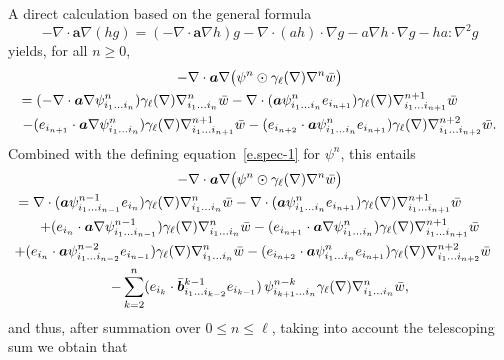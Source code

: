 \documentclass[JEP,XML,SOM,Unicode,published]{cedram}
\theoremstyle{plain}
\theoremstyle{definition}
\numberwithin{equation}{section}
\newcommand{\ee}{e}
\newcommand{\Aa}{\boldsymbol a}
\newcommand{\bb}{{\boldsymbol b}}
\begin{document}
A direct calculation {based on the general formula\vspace*{-3pt}
\[
-\nabla\cdot \Aa\nabla(hg)=(-\nabla\cdot\Aa\nabla h)g-\nabla\cdot(ah)\cdot\nabla g-a\nabla h\cdot\nabla g-ha:\nabla^2g
\]
yields, for all $n\ge0$,\vspace*{-3pt}
\begin{multline*}
-\nabla \cdot \Aa \nabla \big( \psi^n \odot \gamma_\ell(\nabla) \nabla^n \bar w\big)
\\
\hspace*{-1cm}= (-\nabla \cdot \Aa \nabla \psi^n_{i_1\ldots i_n}) \gamma_\ell(\nabla) \nabla^n_{i_1\ldots i_n} \bar w
-\nabla \cdot (\Aa \psi^n_{i_1\ldots i_n} e_{i_{n+1}}) \gamma_\ell(\nabla) \nabla^{n+1}_{i_1\ldots i_{n+1}} \bar w
\\
-(\ee_{i_{n+1}}\cdot\Aa \nabla \psi^n_{i_1\ldots i_n}) \gamma_\ell(\nabla) \nabla^{n+1}_{i_1\ldots i_{n+1}} \bar w- (\ee_{i_{n+2}}\cdot\Aa \psi^n_{i_1\ldots i_n} e_{i_{n+1}})\gamma_\ell(\nabla) \nabla^{n+2}_{i_1\ldots i_{n+2}} \bar w.
\end{multline*}
Combined with the defining equation~\eqref{e.spec-1} for $\psi^n$, this entails\vspace*{-3pt}
\begin{multline*}
-\nabla \cdot \Aa \nabla \big( \psi^n \odot \gamma_\ell(\nabla) \nabla^n \bar w\big)
\\
\hspace*{-1cm}= \nabla\cdot(\Aa\psi^{n-1}_{i_1\ldots i_{n-1}}\ee_{i_n}) \gamma_\ell(\nabla) \nabla^n_{i_1\ldots i_n} \bar w
-\nabla \cdot (\Aa \psi^n_{i_1\ldots i_n} e_{i_{n+1}}) \gamma_\ell(\nabla) \nabla^{n+1}_{i_1\ldots i_{n+1}} \bar w\\
+(\ee_{i_n}\cdot\Aa\nabla\psi^{n-1}_{i_1\ldots i_{n-1}})\gamma_\ell(\nabla) \nabla^n_{i_1\ldots i_n} \bar w
-(\ee_{i_{n+1}}\cdot\Aa \nabla \psi^n_{i_1\ldots i_n}) \gamma_\ell(\nabla) \nabla^{n+1}_{i_1\ldots i_{n+1}} \bar w\\
\shoveright{+(\ee_{i_n}\cdot\Aa\psi^{n-2}_{i_1\ldots i_{n-2}}\ee_{i_{n-1}})\gamma_\ell(\nabla) \nabla^n_{i_1\ldots i_n} \bar w
-(\ee_{i_{n+2}}\cdot\Aa \psi^n_{i_1\ldots i_n} e_{i_{n+1}})\gamma_\ell(\nabla) \nabla^{n+2}_{i_1\ldots i_{n+2}} \bar w}\\
-\sum_{k=2}^{n}(\ee_{i_{k}}\cdot\bar\bb{}^{k-1}_{i_1\ldots i_{k-2}}\ee_{i_{k-1}})\,\psi^{n-k}_{i_{k+1}\ldots i_n}\gamma_\ell(\nabla) \nabla^n_{i_1\ldots i_n} \bar w,
\end{multline*}
and thus, after summation over $0\le n\le\ell$, {taking into account the telescoping sum we obtain that}\vspace*{-5pt}
}
\end{document}
